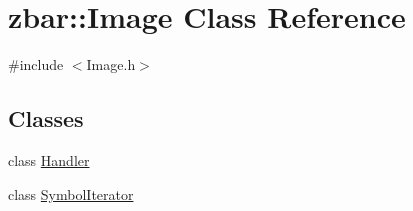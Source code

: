 \hypertarget{classzbar_1_1_image}{
\section{zbar::Image Class Reference}
\label{classzbar_1_1_image}
}


{\ttfamily \#include $<$Image.h$>$}

\subsection*{Classes}
\begin{DoxyCompactItemize}
\item 
class \hyperlink{classzbar_1_1_image_1_1_handler}{Handler}
\item 
class \hyperlink{classzbar_1_1_image_1_1_symbol_iterator}{SymbolIterator}
\end{DoxyCompactItemize}
